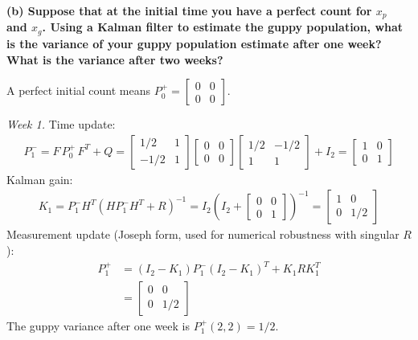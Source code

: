 \documentclass[12pt]{article}
\begin{document}
\begin{stepbox}
\textbf{(b) Suppose that at the initial time you have a perfect count for $x_p$ and $x_g$. Using a Kalman filter to estimate the guppy population, what is the variance of your guppy population estimate after one week? What is the variance after two weeks?}

\vspace{0.3cm}

A perfect initial count means $P_0^+ = \begin{bmatrix} 0 & 0 \\ 0 & 0 \end{bmatrix}$.

\textit{Week 1.} Time update:
\begin{align}
P_1^- = F\,P_0^+\,F^T + Q = \begin{bmatrix} 1/2 & 1 \\ -1/2 & 1 \end{bmatrix}\begin{bmatrix} 0 & 0 \\ 0 & 0 \end{bmatrix}\begin{bmatrix} 1/2 & -1/2 \\ 1 & 1 \end{bmatrix} + I_2 = \begin{bmatrix} 1 & 0 \\ 0 & 1 \end{bmatrix}
\end{align}
Kalman gain:
\begin{align}
K_1 = P_1^- H^T (H P_1^- H^T + R)^{-1} = I_2 \left(I_2 + \begin{bmatrix} 0 & 0 \\ 0 & 1 \end{bmatrix}\right)^{-1} = \begin{bmatrix} 1 & 0 \\ 0 & 1/2 \end{bmatrix}
\end{align}
Measurement update (Joseph form, used for numerical robustness with singular $R$):
\begin{align}
P_1^+ &= (I_2 - K_1)P_1^-(I_2 - K_1)^T + K_1 R K_1^T \nonumber \\
&= \begin{bmatrix} 0 & 0 \\ 0 & 1/2 \end{bmatrix}
\end{align}
The guppy variance after one week is $P_1^+(2,2) = \boxed{1/2}$.


\end{stepbox}
\end{document}
